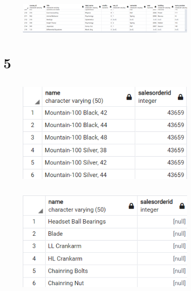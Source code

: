\documentclass{article}
\begin{document}
\subsection{}
\begin{figure}[H]
    \centering
    \includegraphics[width=0.8\textwidth]{figures/4-c.png}
    \caption
	{
	}
    \label{fig:fig1}
\end{figure}

\section{5}
\subsection{}
\begin{figure}[H]
    \centering
    \includegraphics[width=0.8\textwidth]{figures/5-a.png}
    \caption
	{
	}
    \label{fig:fig1}
\end{figure}

\subsection{}
\begin{figure}[H]
    \centering
    \includegraphics[width=0.8\textwidth]{figures/5-b.png}
    \caption
	{
	}
    \label{fig:fig1}
\end{figure}
\end{document}
